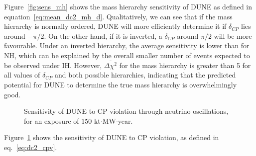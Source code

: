 Figure~\ref{fig:sens_mh} shows the mass hierarchy sensitivity of DUNE as
defined in equation~\ref{eq:mean_dc2_mh_d}. 
Qualitatively, we can see that if
the mass hierarchy is normally ordered, DUNE will more efficiently determine it
if $\delta_{CP}$ lies around $-\pi/2$. On the other hand, if it is inverted, a $\delta_{CP}$
around $\pi/2$ will be more favourable. Under an inverted hierarchy, the
average sensitivity is lower than for NH, which can be explained by the overall smaller
number of events expected to be observed under IH. However,
$\overline{\Delta\chi^2}$ for the mass hierarchy is greater than 5 for all
values of $\delta_{CP}$ and both possible hierarchies, indicating that the
predicted potential for DUNE to determine the true mass hierarchy is
overwhelmingly good.
\begin{figure}
	\centering
\caption{Sensitivity of DUNE to CP violation through neutrino oscillations, for an
	exposure of 150 kt$\cdot$MW$\cdot$year.}
\label{fig:sens_cp}
\end{figure}

Figure~\ref{fig:sens_cp} shows the sensitivity of DUNE to CP violation, as
defined in eq.~\ref{eq:dc2_cpv}.





